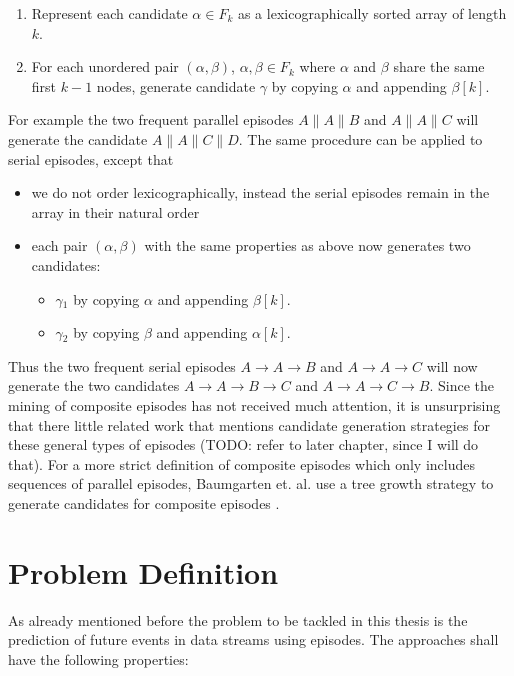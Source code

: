 \begin{enumerate}
	\item Represent each candidate $\alpha \in F_k$ as a lexicographically sorted array of length $k$.
	\item For each unordered pair $(\alpha , \beta )$, $\alpha ,\beta \in F_k$ where $\alpha$ and $\beta$ share the same first $k-1$ nodes, generate candidate $\gamma$ by copying $\alpha$ and appending $\beta [k]$.
\end{enumerate}

For example the two frequent parallel episodes $A \| A \| B$ and $A \| A \| C$ will generate the candidate $A \| A \| C \| D$. \newline
The same procedure can be applied to serial episodes, except that
\begin{itemize}
	\item we do not order lexicographically, instead the serial episodes remain in the array in their natural order
	\item each pair $(\alpha , \beta )$ with the same properties as above now generates two candidates:
	\begin{itemize}
		\item $\gamma{_1}$ by copying $\alpha$ and appending $\beta [k]$.
		\item $\gamma{_2}$ by copying $\beta$ and appending $\alpha [k]$.
	\end{itemize}
\end{itemize}

Thus the two frequent serial episodes $A \rightarrow A \rightarrow B$ and $A \rightarrow A \rightarrow C$ will now generate the two candidates $A \rightarrow A \rightarrow B \rightarrow C$ and $A \rightarrow A \rightarrow C \rightarrow B$. \newline
Since the mining of composite episodes has not received much attention, it is unsurprising that there little related work that mentions candidate generation strategies for these general types of episodes (TODO: refer to later chapter, since I will do that). For a more strict definition of composite episodes which only includes sequences of parallel episodes, Baumgarten et. al. use a tree growth strategy to generate candidates for composite episodes \cite{baumgarten2003tree}. %

\section{Problem Definition}
As already mentioned before the problem to be tackled in this thesis is the prediction of future events in data streams using episodes. The approaches shall have the following properties:

